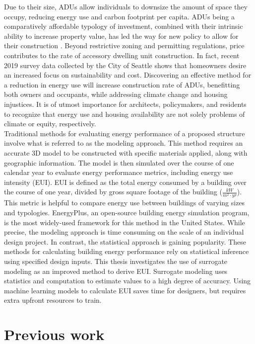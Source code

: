 Due to their size, ADUs allow individuals to downsize the amount of space they occupy, reducing energy use and carbon footprint per capita. ADUs being a comparatively affordable typology of investment, combined with their intrinsic ability to increase property value, has led the way for new policy to allow for their construction \cite{chappleJumpstartingMarketAccessory2017}. Beyond restrictive zoning and permitting regulations, price contributes to the rate of accessory dwelling unit construction. In fact, recent 2019 survey data collected by the City of Seattle shows that homeowners desire an increased focus on sustainability and cost. Discovering an effective method for a reduction in energy use will increase construction rate of ADUs, benefitting both owners and occupants, while addressing climate change and housing injustices. It is of utmost importance for architects, policymakers, and residents to recognize that energy use and housing availability are not solely problems of climate or equity, respectively.\\

Traditional methods for evaluating energy performance of a proposed structure involve what is referred to as the modeling approach. This method requires an accurate 3D model to be constructed with specific materials applied, along with geographic information. The model is then simulated over the course of one calendar year to evaluate energy performance metrics, including energy use intensity (EUI). EUI is defined as the total energy consumed by a building over the course of one year, divided by gross square footage of the building (\(\frac{kW}{m^2\cdot yr}\)). This metric is helpful to compare energy use between buildings of varying sizes and typologies. EnergyPlus, an open-source building energy simulation program, is the most widely-used framework for this method in the United States. While precise, the modeling approach is time consuming on the scale of an individual design project. In contrast, the statistical approach is gaining popularity. These methods for calculating building energy performance rely on statistical inference using specified design inputs. This thesis investigates the use of surrogate modeling as an improved method to derive EUI. Surrogate modeling uses statistics and computation to estimate values to a high degree of accuracy. Using machine learning models to calculate EUI saves time for designers, but requires extra upfront resources to train.

\section{Previous work}

